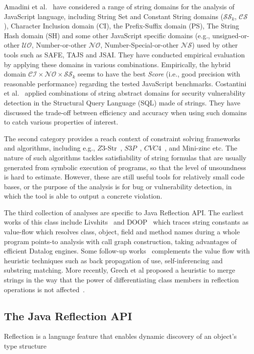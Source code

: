 \documentclass{llncs}
\begin{document}
Amadini et al.~\cite{Amadini17} have considered a range of string domains for the analysis of JavaScript language, including String Set and Constant String domains ($\mathcal{SS}_k$, $\mathcal{CS}$), Character Inclusion domain (CI), the Prefix-Suffix domain (PS), The String Hash domain (SH) and some other JavaScript specific domains (e.g., unsigned-or-other $\mathcal{UO}$, Number-or-other $\mathcal{NO}$, Number-Special-or-other $\mathcal{NS}$) used by other tools such as SAFE, TAJS and JSAI. They have conducted empirical evaluation by applying these domains in various combinations. Empirically, the hybrid domain $\mathcal{CI}\times\mathcal{NO}\times\mathcal{SS}_k$ seems to have the best \emph{Score} (i.e., good precision with reasonable performance) regarding the tested JavaScript benchmarks.
Costantini et al.~\cite{Costantini13} applied combinations of string abstract domains for security vulnerability detection in the Structural Query Language (SQL) made of strings. They have discussed the trade-off between efficiency and accuracy when using such domains to catch various properties of interest.

The second category provides a reach context of constraint solving frameworks and algorithms, including e.g., $Z3$-Str~\cite{z3str3}, $S3P$~\cite{TrinhCJ16}, $CVC4$~\cite{Barrett11}, and Mini-zinc etc. The nature of such algorithms tackles satisfiability of string formulas that are usually generated from symbolic execution of programs, so that the level of unsoundness is hard to estimate. However, these are still useful tools for relatively small code bases, or the purpose of the analysis is for bug or vulnerability detection, in which the tool is able to output a concrete violation. 

The third collection of analyses are specific to Java Reflection API. The earliest works of this class include Livshits~\cite{Livshits06} and DOOP~\cite{Bravenboer09} which traces string constants as value-flow which resolves class, object, field and method names during a whole program points-to analysis with call graph construction, taking advantages of efficient Datalog engines. Some follow-up works~\cite{LTSX14,Smaragdakis11} complements
the value flow with heuristic techniques such as back propagation of use, self-inferencing and substring matching. More recently, Grech et al proposed a heuristic to merge strings in the way that the power of differentiating class members in reflection operations is not affected~\cite{GrechKS18}.


\subsection*{The Java Reflection API}

Reflection is a language feature that enables dynamic discovery of an object's type structure



%


\end{document}
